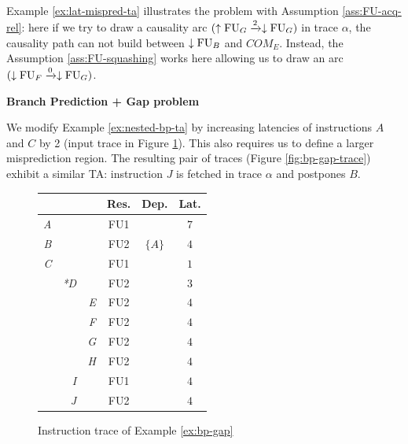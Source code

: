 Example \ref{ex:lat-mispred-ta} illustrates the problem with Assumption \ref{ass:FU-acq-rel}:  here if we try to draw a causality arc $(\uparrow\mathrm{FU}_G \xrightarrow{2} \downarrow\mathrm{FU}_G)$ in trace $\alpha$, the causality path can not build between $\downarrow\mathrm{FU}_B$ and $COM_E$. Instead, the Assumption \ref{ass:FU-squashing} works here allowing us to draw an arc $(\downarrow\mathrm{FU}_F \xrightarrow{0} \downarrow\mathrm{FU}_G)$.



\begin{example}
\textbf{Branch Prediction + Gap problem}

We modify Example \ref{ex:nested-bp-ta} by increasing latencies of instructions $A$ and $C$ by 2 (input trace in Figure \ref{fig:bp-gap-input}). This also requires us to define a larger misprediction region. The resulting pair of traces (Figure \ref{fig:bp-gap-trace}) exhibit a similar TA: instruction $J$ is fetched in trace $\alpha$ and postpones $B$.

\label{ex:bp-gap}
\end{example}

\begin{figure}[H]
    \centering
    \begin{tabular}{rrr|ccc}
    &  &  & Res. & Dep. & Lat. \\ \hline
    \textit{A} &  &  & FU1 &  & $7$ \\
    \textit{B} &  &  & FU2 & $\{A\}$ & $4$ \\
    \textit{C} &  &  & FU1 &  & $1$ \\
    & \textit{*D} &  & FU2 &  & $3$ \\
    &  & \textit{E} & FU2 &  & $4$ \\
    &  & \textit{F} & FU2 &  & $4$ \\
    &  & \textit{G} & FU2 &  & $4$ \\
    &  & \textit{H} & FU2 &  & $4$ \\
    & \textit{I} &  & FU1 &  & $4$ \\
    & \textit{J} &  & FU2 &  & $4$ \\
    \end{tabular}    

    \caption{Instruction trace of Example \ref{ex:bp-gap}}
    \label{fig:bp-gap-input}
\end{figure}


